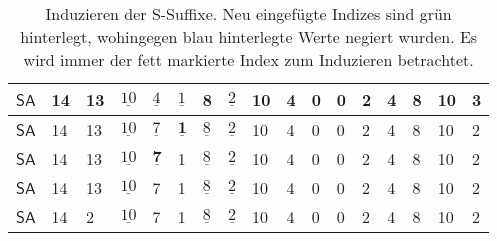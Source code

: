 \begin{table}
{\begin{tabular}{l|lllllllllllllll|l}
			$\mathsf{SA}$ & 14                         & 13 & $\underline{10}$ & $\underline{4}$                         & \cellcolor[HTML]{32CB00}$\underline{1}$ & \textbf{8}                              & \cellcolor[HTML]{34CDF9}$\underline{2}$ & 10                         & 4                         & 0 & 0  & 2  & 4  & 8  & 10 & \cellcolor[HTML]{32CB00}3 \\ \hline
			$\mathsf{SA}$ & 14                         & 13 & $\underline{10}$ & \cellcolor[HTML]{32CB00}$\underline{7}$ & $\underline{\textbf{1}}$                & \cellcolor[HTML]{34CDF9}$\underline{8}$ & $\underline{2}$                         & 10                         & 4                         & 0 & 0  & 2  & 4  & 8  & 10 & \cellcolor[HTML]{32CB00}2 \\ \hline
			$\mathsf{SA}$ & 14                         & 13 & $\underline{10}$ & $\underline{\textbf{7}}$                & \cellcolor[HTML]{34CDF9}1               & $\underline{8}$                         & $\underline{2}$                         & 10                         & 4                         & 0 & 0  & 2  & 4  & 8  & 10 & 2                         \\ \hline
			$\mathsf{SA}$ & 14                         & 13 & $\underline{10}$ & \cellcolor[HTML]{34CDF9}7               & 1                                       & $\underline{8}$                         & $\underline{2}$                         & 10                         & 4                         & 0 & 0  & 2  & 4  & 8  & 10 & 2                         \\ \hline
			$\mathsf{SA}$ & \cellcolor[HTML]{32CB00}14 & 2  & $\underline{10}$ & 7                                       & 1                                       & $\underline{8}$                         & $\underline{2}$                         & 10                         & 4                         & 0 & 0  & 2  & 4  & 8  & 10 & 2 \\ \hline                       
		\end{tabular}%
	}
	\caption{Induzieren der S-Suffixe. Neu eingefügte Indizes sind grün hinterlegt, wohingegen blau hinterlegte Werte negiert wurden. Es wird immer der fett markierte Index zum Induzieren betrachtet.}
	\label{dss:table:induce-s}
\end{table}

